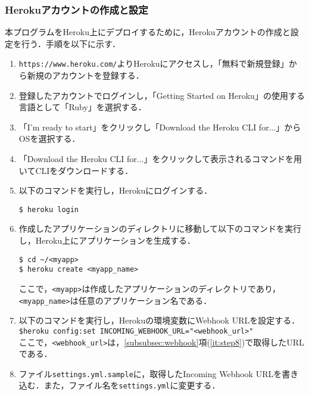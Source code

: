 \documentclass[12pt]{jsarticle}
\begin{document}
\subsubsection{Herokuアカウントの作成と設定}\label{subsubsec:heroku}
本プログラムをHeroku上にデプロイするために，Herokuアカウントの作成と設定を行う．手順を以下に示す．
\begin{enumerate}
\item \verb|https://www.heroku.com/|よりHerokuにアクセスし，「無料で新規登録」から新規のアカウントを登録する．
\item 登録したアカウントでログインし，「Getting Started on Heroku」の使用する言語として「Ruby」を選択する．
\item 「I'm ready to start」をクリックし「Download the Heroku CLI for...」からOSを選択する．
\item 「Download the Heroku CLI for...」をクリックして表示されるコマンドを用いてCLIをダウンロードする．
\item 以下のコマンドを実行し，Herokuにログインする．
\begin{verbatim}
$ heroku login
\end{verbatim}
\item 作成したアプリケーションのディレクトリに移動して以下のコマンドを実行し，Heroku上にアプリケーションを生成する．\label{it:step6}
\begin{verbatim}
$ cd ~/<myapp>
$ heroku create <myapp_name>
\end{verbatim}
 ここで，\verb|<myapp>|は作成したアプリケーションのディレクトリであり，\verb|<myapp_name>|は任意のアプリケーション名である．
\item 以下のコマンドを実行し，Herokuの環境変数にWebhook URLを設定する．\\
\verb|$heroku config:set INCOMING_WEBHOOK_URL="<webhook_url>"|\\
ここで，\verb|<webhook_url>|は，\ref{subsubsec:webhook}項(\ref{it:step8})で取得したURLである．
\item ファイル\verb|settings.yml.sample|に，取得したIncoming Webhook URLを書き込む．また，ファイル名を\verb|settings.yml|に変更する．
\end{enumerate}
\end{document}
